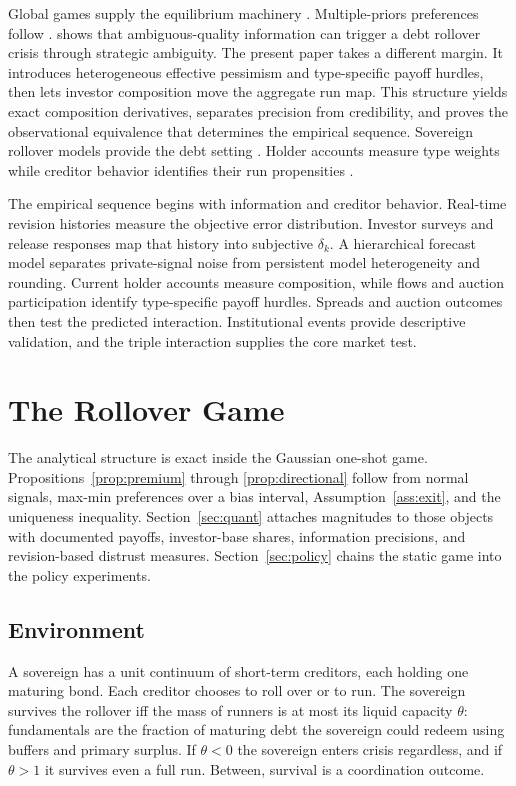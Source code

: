 \documentclass[11pt]{article}
\theoremstyle{definition}
\begin{document}
Global games supply the equilibrium machinery \citep{Hellwig2002,MorrisShin2003,MorrisShin2004}. Multiple-priors preferences follow \citet{GilboaSchmeidler1989}. \citet{Ui2025} shows that ambiguous-quality information can trigger a debt rollover crisis through strategic ambiguity. The present paper takes a different margin. It introduces heterogeneous effective pessimism and type-specific payoff hurdles, then lets investor composition move the aggregate run map. This structure yields exact composition derivatives, separates precision from credibility, and proves the observational equivalence that determines the empirical sequence. Sovereign rollover models provide the debt setting \citep{Calvo1988,ColeKehoe2000,BocolaDovis2019}. Holder accounts measure type weights while creditor behavior identifies their run propensities \citep{ArslanalpTsuda2014}.

The empirical sequence begins with information and creditor behavior. Real-time revision histories measure the objective error distribution. Investor surveys and release responses map that history into subjective $\delta_k$. A hierarchical forecast model separates private-signal noise from persistent model heterogeneity and rounding. Current holder accounts measure composition, while flows and auction participation identify type-specific payoff hurdles. Spreads and auction outcomes then test the predicted interaction. Institutional events provide descriptive validation, and the triple interaction supplies the core market test.

\section{The Rollover Game}\label{sec:model}

The analytical structure is exact inside the Gaussian one-shot game. Propositions~\ref{prop:premium} through \ref{prop:directional} follow from normal signals, max-min preferences over a bias interval, Assumption~\ref{ass:exit}, and the uniqueness inequality. Section~\ref{sec:quant} attaches magnitudes to those objects with documented payoffs, investor-base shares, information precisions, and revision-based distrust measures. Section~\ref{sec:policy} chains the static game into the policy experiments.

\subsection{Environment}

A sovereign has a unit continuum of short-term creditors, each holding one maturing bond. Each creditor chooses to roll over or to run. The sovereign survives the rollover iff the mass of runners is at most its liquid capacity $\theta$: fundamentals are the fraction of maturing debt the sovereign could redeem using buffers and primary surplus. If $\theta < 0$ the sovereign enters crisis regardless, and if $\theta > 1$ it survives even a full run. Between, survival is a coordination outcome.
\end{document}
